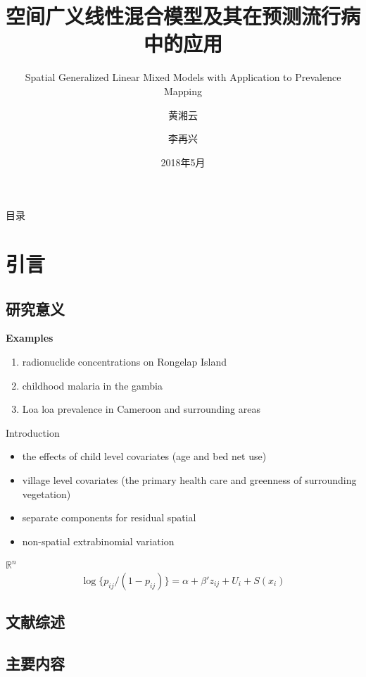 \documentclass[11pt,compress,xcolor=x11names,UTF8]{ctexbeamer}
\title{空间广义线性混合模型及其在预测流行病中的应用}
\subtitle{Spatial Generalized Linear Mixed Models with Application to Prevalence Mapping}
\author{黄湘云\and 李再兴}
\institute[CUMTB]{理学院\\ 中国矿业大学（北京）}
\date{2018年5月}
\begin{document}
\frame{\maketitle}

\begin{frame}{目录}
  \tableofcontents  
\end{frame}


\section{引言}


\subsection{研究意义}

\begin{frame}
\textbf{Examples}

\begin{enumerate}
\item radionuclide concentrations on Rongelap Island
\item childhood malaria in the gambia
\item Loa loa prevalence in Cameroon and surrounding areas
\end{enumerate}

\end{frame}

\begin{frame}{Introduction}

\citet{Diggle2002}
\begin{itemize}
\item the effects of child level covariates (age and bed net use)
\item village level covariates (the primary health care and greenness of surrounding vegetation)
\item separate components for residual spatial
\item non-spatial extrabinomial variation
\end{itemize}
$\mathbb{R}^{n}$
$$ \log \{p_{ij}/(1-p_{ij})\} =\alpha + \beta'z_{ij} + U_{i} + S(x_{i})$$

\end{frame}

\subsection{文献综述}

\subsection{主要内容}
\end{document}
